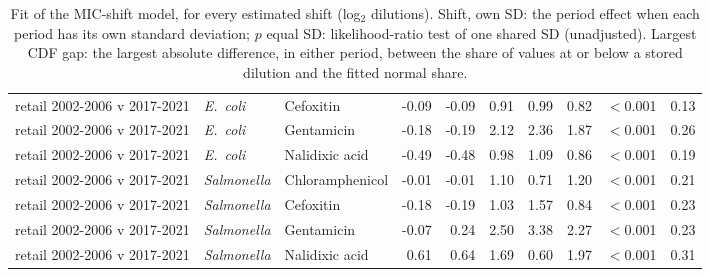 \begin{table}[h]
\begin{tabular}{lllrrrrrrr}
retail 2002-2006 v 2017-2021 & \textit{E.~coli} & Cefoxitin & -0.09 & -0.09 & 0.91 & 0.99 & 0.82 & $<$0.001 & 0.13 \\
retail 2002-2006 v 2017-2021 & \textit{E.~coli} & Gentamicin & -0.18 & -0.19 & 2.12 & 2.36 & 1.87 & $<$0.001 & 0.26 \\
retail 2002-2006 v 2017-2021 & \textit{E.~coli} & Nalidixic acid & -0.49 & -0.48 & 0.98 & 1.09 & 0.86 & $<$0.001 & 0.19 \\
retail 2002-2006 v 2017-2021 & \textit{Salmonella} & Chloramphenicol & -0.01 & -0.01 & 1.10 & 0.71 & 1.20 & $<$0.001 & 0.21 \\
retail 2002-2006 v 2017-2021 & \textit{Salmonella} & Cefoxitin & -0.18 & -0.19 & 1.03 & 1.57 & 0.84 & $<$0.001 & 0.23 \\
retail 2002-2006 v 2017-2021 & \textit{Salmonella} & Gentamicin & -0.07 & 0.24 & 2.50 & 3.38 & 2.27 & $<$0.001 & 0.23 \\
retail 2002-2006 v 2017-2021 & \textit{Salmonella} & Nalidixic acid & 0.61 & 0.64 & 1.69 & 0.60 & 1.97 & $<$0.001 & 0.31 \\
\bottomrule
\end{tabular}
\caption{Fit of the MIC-shift model, for every estimated shift (log$_2$ dilutions). Shift, own SD: the period effect when each period has its own standard deviation; $p$ equal SD: likelihood-ratio test of one shared SD (unadjusted). Largest CDF gap: the largest absolute difference, in either period, between the share of values at or below a stored dilution and the fitted normal share.}
\end{table}

